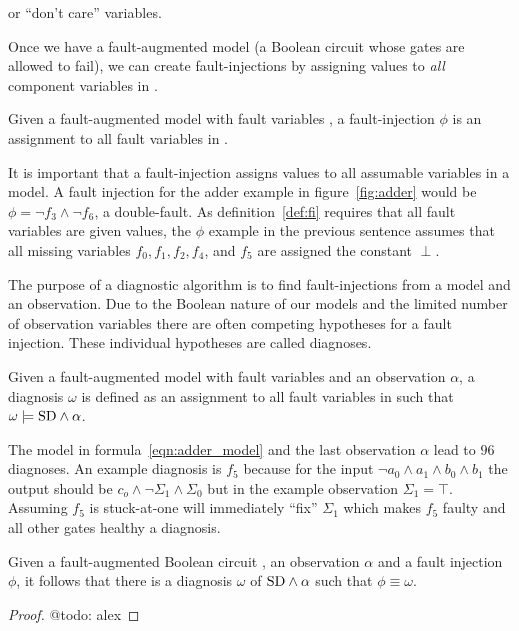 \documentclass{article}
\begin{document}
or ``don't care'' variables.
\par
Once we have a fault-augmented model (a Boolean circuit whose gates
are allowed to fail), we can create fault-injections by assigning
values to \textit{all} component variables in \comps.
%
\begin{definition}\label{def:fi}
  Given a fault-augmented model \sd with fault variables \comps, a
  fault-injection $\phi$ is an assignment to all fault variables in
  \comps.
\end{definition}
%
It is important that a fault-injection assigns values to all assumable
variables in a model. A fault injection for the adder example in
figure~\ref{fig:adder} would be $\phi = \neg{f_3} \wedge \neg{f_6}$, a
double-fault. As definition~\ref{def:fi} requires that all fault
variables are given values, the $\phi$ example in the previous sentence
assumes that all missing variables $f_0, f_1, f_2, f_4$, and $f_5$ are
assigned the constant $\perp$.
\par
The purpose of a diagnostic algorithm is to find fault-injections from
a model and an observation. Due to the Boolean nature of our models
and the limited number of observation variables there are often
competing hypotheses for a fault injection. These individual
hypotheses are called diagnoses.
%
\begin{definition}[Diagnosis]
  Given a fault-augmented model \sd with fault variables \comps and an
  observation $\alpha$, a diagnosis $\omega$ is defined as an
  assignment to all fault variables in \comps such that $\omega
  \models \mathrm{SD} \wedge \alpha$.
\end{definition}
%
The model in formula~\ref{eqn:adder_model} and the last observation
$\alpha$ lead to $96$ diagnoses. An example diagnosis is $f_5$ because
for the input $\neg{a_0} \wedge a_1 \wedge b_0 \wedge b_1$ the output
should be $c_o \wedge \neg{\Sigma_1} \wedge \Sigma_0$ but in the
example observation $\Sigma_1 = \top$. Assuming $f_5$ is stuck-at-one
will immediately ``fix'' $\Sigma_1$ which makes $f_5$ faulty and all
other gates healthy a diagnosis.
%
\begin{proposition}
  Given a fault-augmented Boolean circuit \sd, an observation $\alpha$
  and a fault injection $\phi$, it follows that there is a diagnosis
  $\omega$ of $\mathrm{SD} \wedge \alpha$ such that $\phi \equiv \omega$.
\end{proposition}
\begin{proof}
  @todo: alex
\end{proof}
\end{document}
